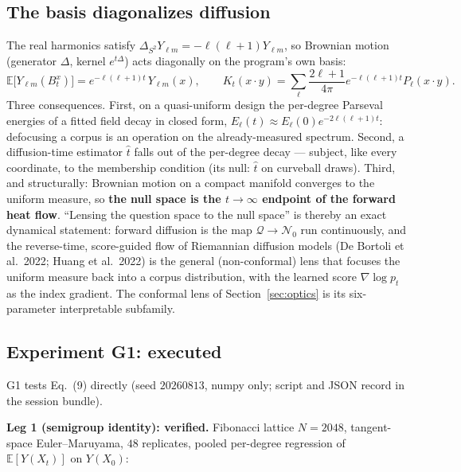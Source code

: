 \documentclass[11pt,a4paper]{article}
\theoremstyle{plain}
\theoremstyle{remark}
\begin{document}
\subsection{The basis diagonalizes diffusion}
The real harmonics satisfy $\Delta_{S^2}Y_{\ell m}=-\ell(\ell+1)Y_{\ell m}$, so Brownian motion (generator $\Delta$, kernel $e^{t\Delta}$) acts diagonally on the program's own basis:
\begin{equation}
\mathbb{E}\big[Y_{\ell m}(B_t^x)\big]=e^{-\ell(\ell+1)t}\,Y_{\ell m}(x),\qquad
K_t(x\!\cdot\!y)=\sum_\ell\frac{2\ell+1}{4\pi}e^{-\ell(\ell+1)t}P_\ell(x\!\cdot\!y).\tag{9}
\end{equation}
Three consequences. First, on a quasi-uniform design the per-degree Parseval energies of a fitted field decay in closed form, $E_\ell(t)\approx E_\ell(0)e^{-2\ell(\ell+1)t}$: defocusing a corpus is an operation on the already-measured spectrum. Second, a diffusion-time estimator $\hat t$ falls out of the per-degree decay --- subject, like every coordinate, to the membership condition (its null: $\hat t$ on curveball draws). Third, and structurally: Brownian motion on a compact manifold converges to the uniform measure, so \textbf{the null space is the $t\to\infty$ endpoint of the forward heat flow}. ``Lensing the question space to the null space'' is thereby an exact dynamical statement: forward diffusion is the map $\mathcal Q\to\mathcal N_0$ run continuously, and the reverse-time, score-guided flow of Riemannian diffusion models (De Bortoli et al.\ 2022; Huang et al.\ 2022) is the general (non-conformal) lens that focuses the uniform measure back into a corpus distribution, with the learned score $\nabla\log p_t$ as the index gradient. The conformal lens of Section~\ref{sec:optics} is its six-parameter interpretable subfamily.

\subsection{Experiment G1: executed}
\label{sec:g1}
G1 tests Eq.~(9) directly (seed $20260813$, numpy only; script and JSON record in the session bundle).

\textbf{Leg 1 (semigroup identity): verified.} Fibonacci lattice $N=2048$, tangent-space Euler--Maruyama, $48$ replicates, pooled per-degree regression of $\mathbb{E}[Y(X_t)]$ on $Y(X_0)$:
\end{document}
